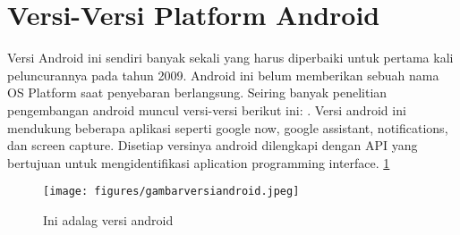 	\section{Versi-Versi Platform Android}
		Versi Android ini sendiri banyak sekali yang harus diperbaiki untuk pertama kali peluncurannya pada tahun 2009. Android ini belum memberikan sebuah nama OS Platform
		saat penyebaran berlangsung. Seiring banyak penelitian pengembangan android muncul versi-versi berikut ini: \cite{suryani2015rancang}. Versi android ini mendukung beberapa aplikasi seperti google now, google assistant, notifications, dan screen capture.
		Disetiap versinya android dilengkapi dengan API yang bertujuan untuk mengidentifikasi aplication programming interface.
\ref{gambarversiandroid}
\begin{figure}[ht]
\centerline{\texttt{[image: figures/gambarversiandroid.jpeg]}}
\caption{Ini adalag versi android}
\label{gambarversiandroid}
\end{figure}

